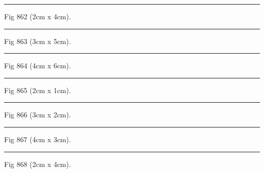 \documentclass[a4paper,11pt]{article}
\begin{document}
\begin{swarmwrap}%
  \begin{minipage}[t]{2cm}
    \centering
    \rule{\linewidth}{4cm}
    {\footnotesize Fig 862 (2cm x 4cm).}
  \end{minipage}%
\end{swarmwrap}%
\swarmwrapnext
\lipsum[112]%

\begin{swarmwrap}%
  \begin{minipage}[t]{3cm}
    \centering
    \rule{\linewidth}{5cm}
    {\footnotesize Fig 863 (3cm x 5cm).}
  \end{minipage}%
\end{swarmwrap}%
\swarmwrapnext
\lipsum[113]%

\begin{swarmwrap}%
  \begin{minipage}[t]{4cm}
    \centering
    \rule{\linewidth}{6cm}
    {\footnotesize Fig 864 (4cm x 6cm).}
  \end{minipage}%
\end{swarmwrap}%
\swarmwrapnext
\lipsum[114]%

\begin{swarmwrap}%
  \begin{minipage}[t]{2cm}
    \centering
    \rule{\linewidth}{1cm}
    {\footnotesize Fig 865 (2cm x 1cm).}
  \end{minipage}%
\end{swarmwrap}%
\swarmwrapnext
\lipsum[115]%

\begin{swarmwrap}%
  \begin{minipage}[t]{3cm}
    \centering
    \rule{\linewidth}{2cm}
    {\footnotesize Fig 866 (3cm x 2cm).}
  \end{minipage}%
\end{swarmwrap}%
\swarmwrapnext
\lipsum[116]%

\begin{swarmwrap}%
  \begin{minipage}[t]{4cm}
    \centering
    \rule{\linewidth}{3cm}
    {\footnotesize Fig 867 (4cm x 3cm).}
  \end{minipage}%
\end{swarmwrap}%
\swarmwrapnext
\lipsum[117]%

\begin{swarmwrap}%
  \begin{minipage}[t]{2cm}
    \centering
    \rule{\linewidth}{4cm}
    {\footnotesize Fig 868 (2cm x 4cm).}
  \end{minipage}%
\end{swarmwrap}%
\swarmwrapnext
\lipsum[118]%
\end{document}
